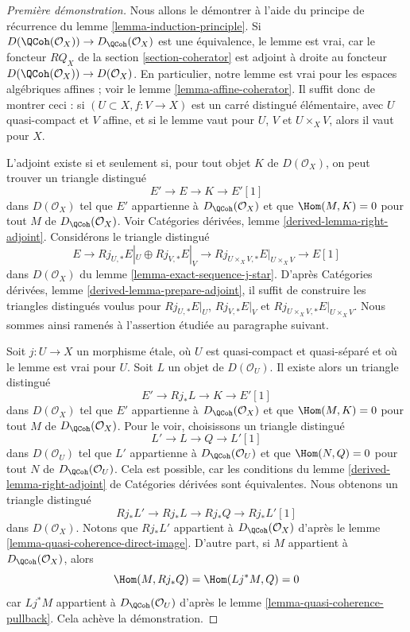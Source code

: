 \begin{proof}[Première démonstration]
Nous allons le démontrer à l'aide du principe de récurrence du
lemme \ref{lemma-induction-principle}.
Si $D(\QCoh(\mathcal{O}_X)) \to D_\QCoh(\mathcal{O}_X)$
est une équivalence, le lemme est vrai, car le foncteur
$RQ_X$ de la section \ref{section-coherator} est adjoint à droite au foncteur
$D(\QCoh(\mathcal{O}_X)) \to D(\mathcal{O}_X)$.
En particulier, notre lemme est vrai pour les espaces algébriques affines ; voir le
lemme \ref{lemma-affine-coherator}.
Il suffit donc de montrer ceci : si $(U \subset X, f : V \to X)$
est un carré distingué élémentaire, avec $U$ quasi-compact
et $V$ affine, et si le lemme vaut pour $U$, $V$ et $U \times_X V$,
alors il vaut pour $X$.

\medskip\noindent
L'adjoint existe si et seulement si, pour tout objet $K$ de
$D(\mathcal{O}_X)$, on peut trouver un triangle distingué
$$
E' \to E \to K \to E'[1]
$$
dans $D(\mathcal{O}_X)$
tel que $E'$ appartienne à $D_\QCoh(\mathcal{O}_X)$ et que
$\Hom(M, K) = 0$ pour tout $M$ de $D_\QCoh(\mathcal{O}_X)$. Voir
Catégories dérivées, lemme \ref{derived-lemma-right-adjoint}.
Considérons le triangle distingué
$$
E \to Rj_{U, *}E|_U \oplus Rj_{V, *}E|_V \to
Rj_{U \times_X V, *}E|_{U \times_X V} \to E[1]
$$
dans $D(\mathcal{O}_X)$ du lemme \ref{lemma-exact-sequence-j-star}.
D'après Catégories dérivées, lemme \ref{derived-lemma-prepare-adjoint},
il suffit de construire les triangles distingués voulus
pour $Rj_{U, *}E|_U$, $Rj_{V, *}E|_V$ et
$Rj_{U \times_X V, *}E|_{U \times_X V}$. Nous sommes ainsi ramenés à l'assertion
étudiée au paragraphe suivant.

\medskip\noindent
Soit $j : U \to X$ un morphisme étale, où
$U$ est quasi-compact et quasi-séparé et où le lemme est vrai pour $U$.
Soit $L$ un objet de $D(\mathcal{O}_U)$.
Il existe alors un triangle distingué
$$
E' \to Rj_*L \to K \to E'[1]
$$
dans $D(\mathcal{O}_X)$
tel que $E'$ appartienne à $D_\QCoh(\mathcal{O}_X)$ et que
$\Hom(M, K) = 0$ pour tout $M$ de $D_\QCoh(\mathcal{O}_X)$.
Pour le voir, choisissons un triangle distingué
$$
L' \to L \to Q \to L'[1]
$$
dans $D(\mathcal{O}_U)$ tel que $L'$ appartienne à $D_\QCoh(\mathcal{O}_U)$
et que $\Hom(N, Q) = 0$ pour tout $N$ de $D_\QCoh(\mathcal{O}_U)$.
Cela est possible, car les conditions du lemme
\ref{derived-lemma-right-adjoint} de Catégories dérivées
sont équivalentes.
Nous obtenons un triangle distingué
$$
Rj_*L' \to Rj_*L \to Rj_*Q \to Rj_*L'[1]
$$
dans $D(\mathcal{O}_X)$. Notons que $Rj_*L'$ appartient à $D_\QCoh(\mathcal{O}_X)$
d'après le lemme \ref{lemma-quasi-coherence-direct-image}.
D'autre part, si $M$ appartient à $D_\QCoh(\mathcal{O}_X)$, alors
$$
\Hom(M, Rj_*Q) = \Hom(Lj^*M, Q) = 0
$$
car $Lj^*M$ appartient à $D_\QCoh(\mathcal{O}_U)$ d'après le
lemme \ref{lemma-quasi-coherence-pullback}.
Cela achève la démonstration.
\end{proof}


